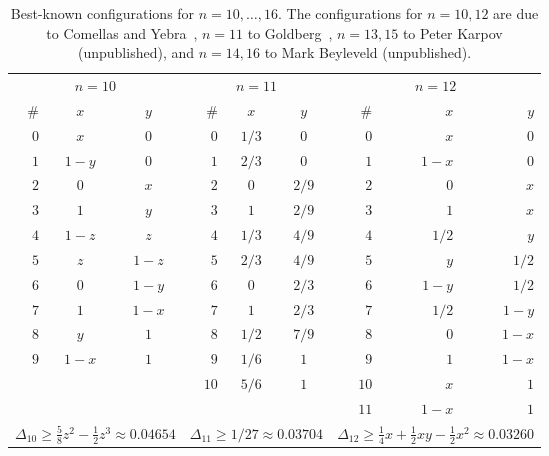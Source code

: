 \documentclass[11pt,a4paper]{article}
\theoremstyle{plain}
\theoremstyle{definition}
\theoremstyle{remark}
\begin{document}
\begin{table}[ht]
\centering
\caption{Best-known configurations for $n=10,\ldots,16$.
The configurations for $n=10,12$ are due to Comellas and Yebra~\cite{comellasyebra2002},
$n=11$ to Goldberg~\cite{goldberg1972maximizing},
$n=13,15$ to Peter Karpov (unpublished),
and $n=14,16$ to Mark Beyleveld (unpublished).}
\label{tab:bestknown}
{\small
\begin{tabular}{r c@{\hskip 6pt} c @{\hskip 14pt} r c@{\hskip 6pt} c @{\hskip 14pt} r r@{\hskip 6pt} r}
\toprule
\multicolumn{3}{c}{$n=10$} & \multicolumn{3}{c}{$n=11$} & \multicolumn{3}{c}{$n=12$} \\
\# & $x$ & $y$ & \# & $x$ & $y$ & \# & $x$ & $y$ \\
\midrule
$0$ & $x$ & $0$       & $0$ & $1/3$ & $0$     & $0$ & $x$ & $0$ \\
$1$ & $1{-}y$ & $0$    & $1$ & $2/3$ & $0$     & $1$ & $1{-}x$ & $0$ \\
$2$ & $0$ & $x$        & $2$ & $0$ & $2/9$     & $2$ & $0$ & $x$ \\
$3$ & $1$ & $y$        & $3$ & $1$ & $2/9$     & $3$ & $1$ & $x$ \\
$4$ & $1{-}z$ & $z$    & $4$ & $1/3$ & $4/9$   & $4$ & $1/2$ & $y$ \\
$5$ & $z$ & $1{-}z$    & $5$ & $2/3$ & $4/9$   & $5$ & $y$ & $1/2$ \\
$6$ & $0$ & $1{-}y$    & $6$ & $0$ & $2/3$     & $6$ & $1{-}y$ & $1/2$ \\
$7$ & $1$ & $1{-}x$    & $7$ & $1$ & $2/3$     & $7$ & $1/2$ & $1{-}y$ \\
$8$ & $y$ & $1$        & $8$ & $1/2$ & $7/9$   & $8$ & $0$ & $1{-}x$ \\
$9$ & $1{-}x$ & $1$    & $9$ & $1/6$ & $1$     & $9$ & $1$ & $1{-}x$ \\
   &     &             & $10$ & $5/6$ & $1$    & $10$ & $x$ & $1$ \\
   &     &             &      &       &        & $11$ & $1{-}x$ & $1$ \\
\midrule
\multicolumn{3}{c}{$\Delta_{10} \ge \tfrac{5}{8}z^2 {-} \tfrac{1}{2}z^3 \approx 0.04654$}
& \multicolumn{3}{c}{$\Delta_{11} \ge 1/27 \approx 0.03704$}
& \multicolumn{3}{c}{$\Delta_{12} \ge \tfrac{1}{4}x {+} \tfrac{1}{2}xy {-} \tfrac{1}{2}x^2 \approx 0.03260$} \\
\bottomrule
\end{tabular}}
\end{table}
\end{document}
